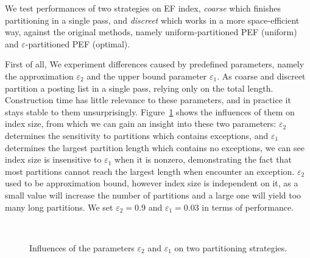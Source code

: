 \documentclass[runningheads,a4paper]{llncs}
\begin{document}
We test performances of two strategies on EF index, \textit{coarse} which finishes partitioning in a single pass, and \textit{discreet} which works in a more space-efficient way, against the original methods, namely uniform-partitioned PEF (uniform) and $\varepsilon$-partitioned PEF (optimal).

First of all, We experiment differences caused by predefined parameters, namely the approximation $\varepsilon_{2}$ and the upper bound parameter $\varepsilon_{1}$. As coarse and discreet partition a posting list in a single pass, relying only on the total length. Construction time has little relevance to these parameters, and in practice it stays stable to them unsurprisingly. Figure~\ref{fig:parameter} shows the influences of them on index size, from which we can gain an insight into these two parameters: $\varepsilon_{2}$ determines the sensitivity to partitions which contains exceptions, and $\varepsilon_{1}$ determines the largest partition length which contains no exceptions, we can see index size is insensitive to $\varepsilon_{1}$ when it is nonzero, demonstrating the fact that most partitions cannot reach the largest length when encounter an exception. $\varepsilon_{2}$ used to be approximation bound, however index size is independent on it, as a small value will increase the number of partitions and a large one will yield too many long partitions. We set $\varepsilon_{2}=0.9$ and $\varepsilon_{1}=0.03$ in terms of performance.

\begin{figure}
	\centering
	\\
	\caption{Influences of the parameters $\varepsilon_{2}$ and $\varepsilon_{1}$ on two partitioning strategies.}
	\label{fig:parameter}
\end{figure}
\end{document}
